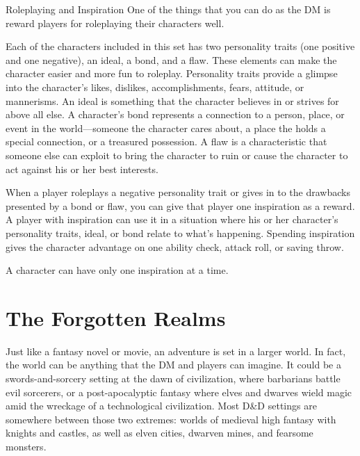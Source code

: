 \documentclass[10pt,a4paper,twoside,bg=print,twocolumn,openany,nodeprecatedcode]{dndbook}
\begin{document}
\begin{DndSidebar}[float=!b]{Roleplaying and Inspiration}
One of the things that you can do as the DM is reward players for roleplaying their characters well.



Each of the characters included in this set has two personality traits (one positive and one negative), an ideal, a bond, and a flaw. These elements can make the character easier and more fun to roleplay. Personality traits provide a glimpse into the character's likes, dislikes, accomplishments, fears, attitude, or mannerisms. An ideal is something that the character believes in or strives for above all else. A character's bond represents a connection to a person, place, or event in the world—someone the character cares about, a place the holds a special connection, or a treasured possession. A flaw is a characteristic that someone else can exploit to bring the character to ruin or cause the character to act against his or her best interests.



When a player roleplays a negative personality trait or gives in to the drawbacks presented by a bond or flaw, you can give that player one inspiration as a reward. A player with inspiration can use it in a situation where his or her character's personality traits, ideal, or bond relate to what's happening. Spending inspiration gives the character advantage on one ability check, attack roll, or saving throw.



A character can have only one inspiration at a time.



\end{DndSidebar}

\section{The Forgotten Realms}
Just like a fantasy novel or movie, an adventure is set in a larger world. In fact, the world can be anything that the DM and players can imagine. It could be a swords-and-sorcery setting at the dawn of civilization, where barbarians battle evil sorcerers, or a post-apocalyptic fantasy where elves and dwarves wield magic amid the wreckage of a technological civilization. Most D\&D settings are somewhere between those two extremes: worlds of medieval high fantasy with knights and castles, as well as elven cities, dwarven mines, and fearsome monsters.
\end{document}
